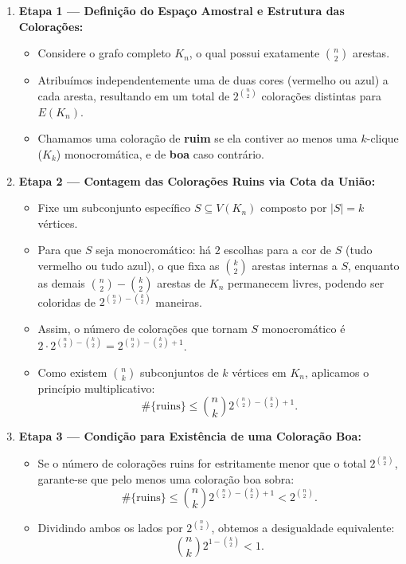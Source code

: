 \documentclass[11pt, a4paper]{article}
\begin{document}
\begin{enumerate}
    \item \textbf{Etapa 1 --- Definição do Espaço Amostral e Estrutura das Colorações:}
    \begin{itemize}
        \item Considere o grafo completo $K_n$, o qual possui exatamente $\binom{n}{2}$ arestas.
        \item Atribuímos independentemente uma de duas cores (vermelho ou azul) a cada aresta, resultando em um total de $2^{\binom{n}{2}}$ colorações distintas para $E(K_n)$.
        \item Chamamos uma coloração de \textbf{ruim} se ela contiver ao menos uma $k$-clique ($K_k$) monocromática, e de \textbf{boa} caso contrário.
    \end{itemize}

    \item \textbf{Etapa 2 --- Contagem das Colorações Ruins via Cota da União:}
    \begin{itemize}
        \item Fixe um subconjunto específico $S \subseteq V(K_n)$ composto por $|S| = k$ vértices.
        \item Para que $S$ seja monocromático: há $2$ escolhas para a cor de $S$ (tudo vermelho ou tudo azul), o que fixa as $\binom{k}{2}$ arestas internas a $S$, enquanto as demais $\binom{n}{2} - \binom{k}{2}$ arestas de $K_n$ permanecem livres, podendo ser coloridas de $2^{\binom{n}{2} - \binom{k}{2}}$ maneiras.
        \item Assim, o número de colorações que tornam $S$ monocromático é $2 \cdot 2^{\binom{n}{2} - \binom{k}{2}} = 2^{\binom{n}{2} - \binom{k}{2} + 1}$.
        \item Como existem $\binom{n}{k}$ subconjuntos de $k$ vértices em $K_n$, aplicamos o princípio multiplicativo:
        \[ \#\{\text{ruins}\} \le \binom{n}{k} 2^{\binom{n}{2} - \binom{k}{2} + 1}. \]
    \end{itemize}

    \item \textbf{Etapa 3 --- Condição para Existência de uma Coloração Boa:}
    \begin{itemize}
        \item Se o número de colorações ruins for estritamente menor que o total $2^{\binom{n}{2}}$, garante-se que pelo menos uma coloração boa sobra:
        \[ \#\{\text{ruins}\} \le \binom{n}{k} 2^{\binom{n}{2} - \binom{k}{2} + 1} < 2^{\binom{n}{2}}. \]
        \item Dividindo ambos os lados por $2^{\binom{n}{2}}$, obtemos a desigualdade equivalente:
        \[ \binom{n}{k} 2^{1 - \binom{k}{2}} < 1. \]
    \end{itemize}


\end{enumerate}
\end{document}
